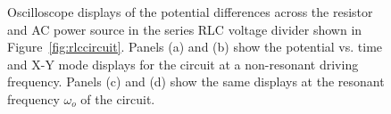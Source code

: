 \documentclass[11pt]{article}
\begin{document}
\begin{figure}[ht]
  \begin{center}
    \vspace{12 pt}
    \caption{Oscilloscope displays of the potential differences across the
      resistor and AC power source in the series RLC voltage divider shown in 
      Figure~\ref{fig:rlccircuit}. Panels (a) and (b) show the potential
      vs. time and X-Y mode displays for the circuit at a non-resonant
      driving frequency. Panels (c) and (d) show the same displays at the
      resonant frequency $\omega_o$ of the circuit.}
    \label{fig:rlcscope}
  \end{center}
\end{figure}
\end{document}
